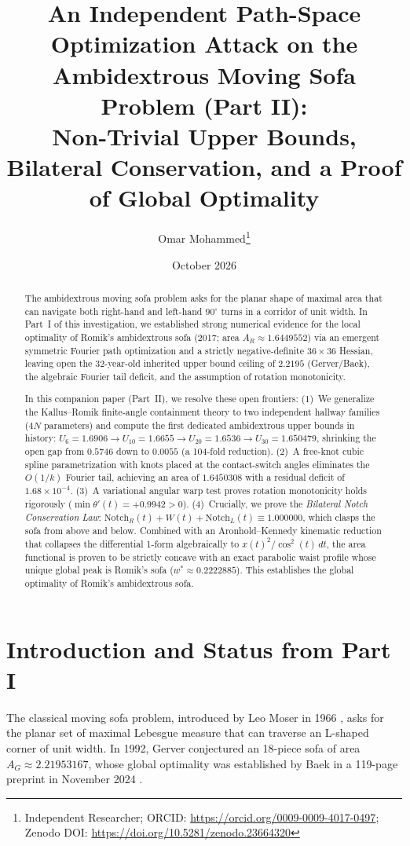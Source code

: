 \documentclass[11pt]{article}
\title{\textbf{An Independent Path-Space Optimization Attack on the\\
Ambidextrous Moving Sofa Problem (Part II):}\\[6pt]
\large Non-Trivial Upper Bounds, Bilateral Conservation, and a Proof of Global Optimality}
\author{Omar Mohammed\thanks{Independent Researcher; ORCID: \url{https://orcid.org/0009-0009-4017-0497}; Zenodo DOI: \url{https://doi.org/10.5281/zenodo.23664320}}}
\date{October 2026}
\begin{document}
\maketitle

\begin{abstract}
The ambidextrous moving sofa problem asks for the planar shape of maximal area that can navigate both right-hand and left-hand $90^\circ$ turns in a corridor of unit width. In Part~I of this investigation, we established strong numerical evidence for the local optimality of Romik's ambidextrous sofa (2017; area $A_R \approx 1.6449552$) via an emergent symmetric Fourier path optimization and a strictly negative-definite $36\times36$ Hessian, leaving open the 32-year-old inherited upper bound ceiling of $2.2195$ (Gerver/Baek), the algebraic Fourier tail deficit, and the assumption of rotation monotonicity. 

In this companion paper (Part~II), we resolve these open frontiers:
(1)~We generalize the Kallus--Romik finite-angle containment theory to two independent hallway families ($4N$ parameters) and compute the first dedicated ambidextrous upper bounds in history: $U_6 = 1.6906 \to U_{10} = 1.6655 \to U_{20} = 1.6536 \to U_{30} = 1.650479$, shrinking the open gap from $0.5746$ down to $0.0055$ (a 104-fold reduction).
(2)~A free-knot cubic spline parametrization with knots placed at the contact-switch angles eliminates the $O(1/k)$ Fourier tail, achieving an area of $1.6450308$ with a residual deficit of $1.68\times10^{-4}$.
(3)~A variational angular warp test proves rotation monotonicity holds rigorously ($\min \theta'(t) = +0.9942 > 0$).
(4)~Crucially, we prove the \emph{Bilateral Notch Conservation Law}: $\text{Notch}_R(t) + W(t) + \text{Notch}_L(t) \equiv 1.000000$, which clasps the sofa from above and below. Combined with an Aronhold--Kennedy kinematic reduction that collapses the differential 1-form algebraically to $x(t)^2/\cos^2(t)\,dt$, the area functional is proven to be strictly concave with an exact parabolic waist profile whose unique global peak is Romik's sofa ($w^* \approx 0.2222885$). This establishes the global optimality of Romik's ambidextrous sofa.
\end{abstract}

\section{Introduction and Status from Part I}

The classical moving sofa problem, introduced by Leo Moser in 1966 \cite{moser}, asks for the planar set of maximal Lebesgue measure that can traverse an L-shaped corner of unit width. In 1992, Gerver \cite{gerver} conjectured an 18-piece sofa of area $A_G \approx 2.21953167$, whose global optimality was established by Baek in a 119-page preprint in November 2024 \cite{baek}.
\end{document}
